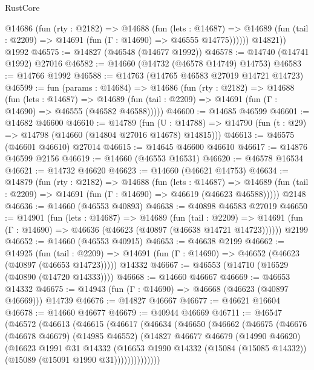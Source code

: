 \begin{lexlean}{RustCore}
\begin{coremodule}
          @14686
            (fun (rty : @2182) =>
            @14688
              (fun (lets : @14687) =>
              @14689 (fun (tail : @2209) => @14691 (fun (Γ : @14690) => @46555 @14775))))))
        @14821))
    @1992
@46575 := @14827 (@46548 (@14677 @1992))
@46578 := @14740 (@14741 @1992) @27016
@46582 := @14660 (@14732 (@46578 @14749) @14753)
@46583 := @14766 @1992
@46588 := @14763 (@14765 @46583 @27019 @14721 @14723)
@46599 := fun (params : @14684) =>
  @14686
    (fun (rty : @2182) =>
    @14688
      (fun (lets : @14687) =>
      @14689 (fun (tail : @2209) => @14691 (fun (Γ : @14690) => @46555 (@46582 @46588)))))
@46600 := @14685 @46599
@46601 := @14682 @46600
@46610 := @14789
    (fun (U : @14788) => @14790 (fun (t : @29) => @14798 (@14660 (@14804 @27016 @14678) @14815)))
@46613 := @46575 (@46601 @46610) @27014
@46615 := @14645 @46600 @46610
@46617 := @14876 @46599 @2156
@46619 := @14660 (@46553 @16531)
@46620 := @46578 @16534
@46621 := @14732 @46620
@46623 := @14660 (@46621 @14753)
@46634 := @14879
    (fun (rty : @2182) =>
    @14688
      (fun (lets : @14687) =>
      @14689 (fun (tail : @2209) => @14691 (fun (Γ : @14690) => @46619 (@46623 @46588)))))
    @2148
@46636 := @14660 (@46553 @40893)
@46638 := @40898 @46583 @27019
@46650 := @14901
    (fun (lets : @14687) =>
    @14689
      (fun (tail : @2209) =>
      @14691 (fun (Γ : @14690) => @46636 (@46623 (@40897 (@46638 @14721 @14723))))))
    @2199
@46652 := @14660 (@46553 @40915)
@46653 := @46638 @2199
@46662 := @14925
    (fun (tail : @2209) => @14691 (fun (Γ : @14690) => @46652 (@46623 (@40897 (@46653 @14723)))))
    @14332
@46667 := @46553 (@14710 (@16529 (@40890 (@14720 @14333))))
@46668 := @14660 @46667
@46669 := @46653 @14332
@46675 := @14943 (fun (Γ : @14690) => @46668 (@46623 (@40897 @46669))) @14739
@46676 := @14827 @46667
@46677 := @46621 @16604
@46678 := @14660 @46677
@46679 := @40944 @46669
@46711 := @46547
    (@46572
      (@46613
        (@46615
          (@46617
            (@46634
              (@46650
                (@46662
                  (@46675
                    (@46676
                      (@46678 @46679)
                      (@14985 @46552)
                      (@14827
                        @46677
                        @46679
                        (@14990 @46620)
                        (@16623
                          @1991
                          @31
                          @14332
                          (@16653
                            @1990
                            @14332
                            (@15084 (@15085 @14332))
                            (@15089 (@15091 @1990 @31))))))))))))))

\end{coremodule}
\end{lexlean}
